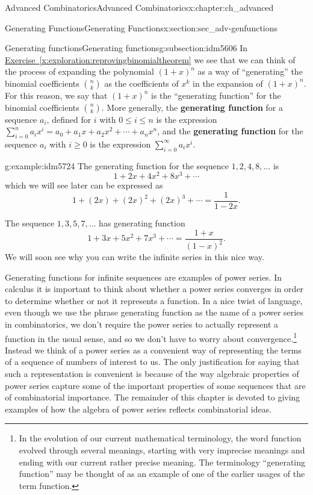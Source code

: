 \documentclass[oneside,10pt,]{book}
\newcommand{\terminology}[1]{\textbf{#1}}
\numberwithin{equation}{chapter}
\begin{document}
\begin{chapterptx}{Advanced Combinatorics}{}{Advanced Combinatorics}{}{}{x:chapter:ch_advanced}
\begin{sectionptx}{Generating Functions}{}{Generating Functions}{}{}{x:section:sec_adv-genfunctions}
\begin{subsectionptx}{Generating functions}{}{Generating functions}{}{}{g:subsection:idm5606}
In \hyperref[x:exploration:reprovingbinomialtheorem]{Exercise~\ref{x:exploration:reprovingbinomialtheorem}} we see that we can think of the process of expanding the polynomial \((1+x)^n\) as a way of ``generating'' the binomial coefficients \(\binom{n}{k}\) as the coefficients of \(x^k\) in the expansion of \((1+x)^n\). For this reason, we say that \((1+x)^n\) is the ``generating function'' for the binomial coefficients \(\binom{n}{k}\). More generally, the \terminology{generating function} for a sequence \(a_i\), defined for \(i\) with \(0\le i\le n\) is the expression \(\sum_{i=0}^n a_ix^i = a_0 + a_1x + a_2x^2 + \cdots + a_nx^n\), and the \terminology{generating function} for the sequence \(a_i\) with \(i\ge 0\) is the expression \(\sum_{i=0}^\infty a_ix^i\).%
\begin{example}{}{g:example:idm5724}%
The generating function for the sequence \(1, 2, 4, 8, \ldots\) is%
\begin{equation*}
1 + 2x + 4x^2 + 8x^3 + \cdots
\end{equation*}
which we will see later can be expressed as%
\begin{equation*}
1+(2x) + (2x)^2 + (2x)^3 + \cdots = \frac{1}{1-2x}\text{.}
\end{equation*}
%
\par
The sequence \(1, 3, 5, 7,\ldots\) has generating function%
\begin{equation*}
1+3x + 5x^2 +7x^3 + \cdots = \frac{1+x}{(1-x)^2}\text{.}
\end{equation*}
We will soon see why you can write the infinite series in this nice way.%
\end{example}
Generating functions for infinite sequences are examples of power series. In calculus it is important to think about whether a power series converges in order to determine whether or not it represents a function. In a nice twist of language, even though we use the phrase generating function as the name of a power series in combinatorics, we don't require the power series to actually represent a function in the usual sense, and so we don't have to worry about convergence.\footnote{In the evolution of our current mathematical terminology, the word function evolved through several meanings, starting with very imprecise meanings and ending with our current rather precise meaning.  The terminology ``generating function'' may be thought of as an example of one of the earlier usages of the term function.\label{g:fn:idm5734}} Instead we think of a power series as a convenient way of representing the terms of a sequence of numbers of interest to us. The only justification for saying that such a representation is convenient is because of the way algebraic properties of power series capture some of the important properties of some sequences that are of combinatorial importance. The remainder of this chapter is devoted to giving examples of how the algebra of power series reflects combinatorial ideas.%

\end{subsectionptx}
\end{sectionptx}
\end{chapterptx}
\end{document}
